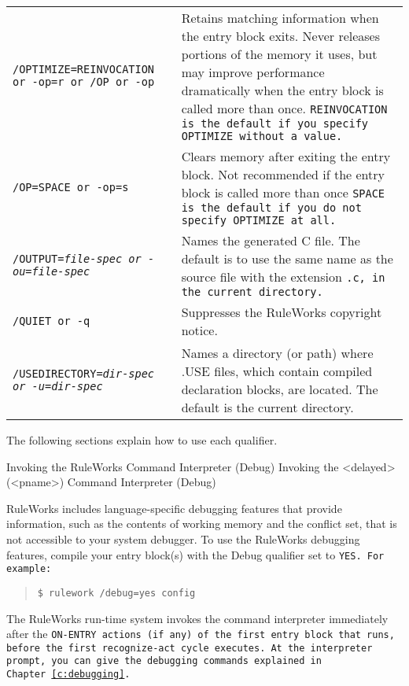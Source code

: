 \begin{longtable}{p{5cm}p{10cm}}
  \raggedright
  \tt{/OPTIMIZE=REINVOCATION} or \tt{-op=r} or \tt{/OP} or  \tt{-op}
         &
           Retains matching          
           information when the      
           entry block exits. Never  
           releases portions of the  
           memory it uses, but may   
           improve performance       
           dramatically when the     
           entry block is called     
           more than once.           
           \tt{REINVOCATION} is the       
           default if you specify    
           \tt{OPTIMIZE} without a value. \\\addlinespace
  \raggedright
  \tt{/OP=SPACE} or \tt{-op=s} 
         &
           Clears memory after     
           exiting the entry block.
           Not recommended if the  
           entry block is called   
           more than once          
           \tt{SPACE} is the default if 
           you do not specify      
           \tt{OPTIMIZE} at all. \\\addlinespace
  \raggedright
  \tt{/OUTPUT=}\it{file-spec} or \tt{-ou=}\it{file-spec}
         &
           Names the generated C   
           file. The default is to 
           use the same name as the
           source file with the    
           extension \tt{.c}, in the    
           current directory. \\\addlinespace
  \tt{/QUIET} or \tt{-q}
         &
           Suppresses the RuleWorks
           copyright notice. \\\addlinespace
  \tt{/USEDIRECTORY=}\it{dir-spec} or \tt{-u=}\it{dir-spec} 
         &
           Names a directory (or  
           path) where .USE files,
           which contain compiled 
           declaration blocks, are
           located. The default is
           the current directory. \\
  \bottomrule
\end{longtable}

The following sections explain how to use each
qualifier.

Invoking the RuleWorks Command Interpreter (Debug)
Invoking the <delayed>(<pname>) Command Interpreter
(Debug)

RuleWorks includes language-specific debugging features
that provide information, such as the contents of working
memory and the conflict set, that is not accessible to
your system debugger. To use the RuleWorks debugging
features, compile your entry block(s) with the Debug
qualifier set to \tt{YES}. For example:
\begin{quote}
\begin{verbatim}
$ rulework /debug=yes config
\end{verbatim}
\end{quote}  
The RuleWorks run-time system invokes the command interpreter
immediately after the \tt{ON-ENTRY} actions (if any) of the first
entry block that runs, before the first recognize-act cycle
executes. At the interpreter prompt, you can give the debugging
commands explained in Chapter~\ref{c:debugging}.

